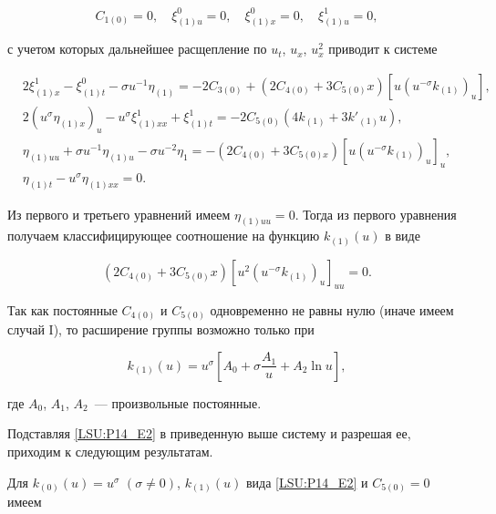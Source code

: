 $$

C_{1(0)}=0, \quad \xi^0_{(1)u}=0, \quad \xi^0_{(1)x}=0, \quad \xi^1_{(1)u}=0, 

$$

с учетом которых дальнейшее расщепление по $u_t$, $u_x$, $u_x^2$ приводит к системе 

\begin{align*}

& 2 \xi^1_{(1)x}-\xi^0_{(1)t}-\sigma u^{-1}\eta_{(1)}=-2C_{3(0)}+(2C_{4(0)}+3C_{5(0)}x)[u(u^{-\sigma}k_{(1)})_u], \\

& 2 (u^{\sigma} \eta_{(1)x})_u -u^{\sigma} \xi^1_{(1)xx}+\xi^1_{(1)t}=-2C_{5(0)}(4k_{(1)}+3k'_{(1)}u), \\

& \eta_{(1)uu}+\sigma u^{-1}\eta_{(1)u}-\sigma u^{-2} \eta_1=-(2C_{4(0)}+3C_{5(0)x}) \left[u (u^{-\sigma} k_{(1)})_u \right]_u, \\

& \eta_{(1)t}-u^{\sigma} \eta_{(1)xx}=0.

\end{align*}



Из первого и третьего уравнений имеем $\eta_{(1)uu}=0$. Тогда из первого уравнения получаем классифицирующее соотношение на функцию $k_{(1)}(u)$ в виде

$$

(2C_{4(0)}+3C_{5(0)}x)[u^2(u^{-\sigma}k_{(1)})_u]_{uu}=0. 

$$

Так как постоянные $C_{4(0)}$ и $C_{5(0)}$ одновременно не равны нулю (иначе имеем случай I), то расширение группы возможно только при 

\begin{equation}

\label{LSU:P14_E2}

k_{(1)}(u)=u^{\sigma}\left[A_0+\sigma \dfrac{A_1}{u}+A_2 \ln u \right],

\end{equation}

где $A_0$, $A_1$, $A_2$~--- произвольные постоянные. 



Подставляя \eqref{LSU:P14_E2} в приведенную выше систему и разрешая ее, приходим к следующим результатам. 



Для $k_{(0)}(u)=u^{\sigma}$ $(\sigma \neq 0)$, $k_{(1)}(u)$ вида \eqref{LSU:P14_E2} и $C_{5(0)}=0$ имеем

